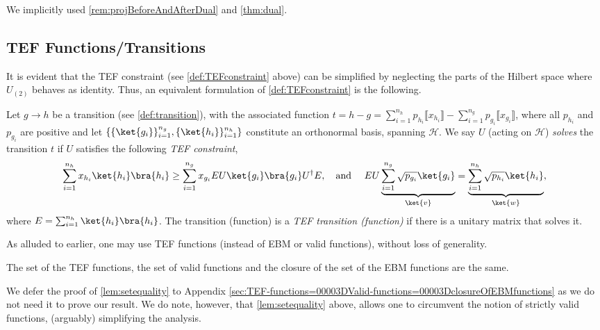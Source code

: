 \documentclass{theoretics}
\begin{document}
We implicitly used \cref{rem:projBeforeAndAfterDual} and  %
\cref{thm:dual}.

\subsection{TEF Functions/Transitions}\label{subsec:TEFfunctions}
%

It is evident that the TEF constraint (see \cref{def:TEFconstraint} above) can be simplified by neglecting the parts of the Hilbert space where $U_{(2)}$ behaves as identity. Thus, an equivalent formulation of \cref{def:TEFconstraint} is the following.

%

\begin{definition}\label{def:TEFconstraint_} Let $g\to h$ be a transition (see \cref{def:transition}), with the associated function $ t= h - g = \sum_{i=1}^{n_h} p_{h_i} \llbracket{x_{h_i}}\rrbracket - \sum_{i=1}^{n_g} p_{g_i} \llbracket{x_{g_i}}\rrbracket$,
  where all $p_{h_i}$ and $p_{g_i}$ are positive and let $\{\{\ket{g_i}\}_{i=1}^{n_g},\{\ket{h_i}\}_{i=1}^{n_h}\}$ constitute an orthonormal basis, spanning $\mathcal{H}$. We say $U$ (acting on $\mathcal{H}$) \emph{solves} the transition $t$ if $U$ satisfies the following \emph{TEF constraint},
  $$\sum_{i=1}^{n_h} x_{h_i} \ket{h_i}\bra{h_i} \ge \sum_{i=1}^{n_g} x_{g_i} E U \ket{g_i}\bra{g_i} U^{\dagger} E, \quad \text{and } \quad EU\underbrace{\sum_{i=1}^{n_g} \sqrt{p_{g_i}} \ket {g_i}}_{\ket{v}} = \underbrace{\sum_{i=1}^{n_h} \sqrt{p_{h_i}} \ket{h_i}}_{\ket{w}},$$
  where $E = \sum_{i=1}^{n_h} \ket{h_i}\bra{h_i}$.
  The transition (function) is a \emph{TEF transition (function)} if there is a unitary matrix that solves it. %

\end{definition}


%
%
%
%
%
%
%
%
%
%
%
%
%
%
%
%
%
%
%
%
%
%
%
%
%
%
%
%

As alluded to earlier, one may use TEF functions (instead of EBM or valid functions), without loss of generality.
%
%
%
%
%
%
%
\begin{lemma}[TEF = closure of EBM = valid]
  The set of the TEF functions, the set of valid functions
  and the closure of the set of the EBM functions
  are the same. \label{lem:setequality}
\end{lemma}

%
We defer the proof of \cref{lem:setequality} to Appendix \ref{sec:TEF-functions=00003DValid-functions=00003DclosureOfEBMfunctions} as we do not need it to prove our result.
We do note, however, that \cref{lem:setequality} above, allows one to circumvent the notion of strictly valid functions, (arguably) simplifying the analysis.
%
%
\end{document}

